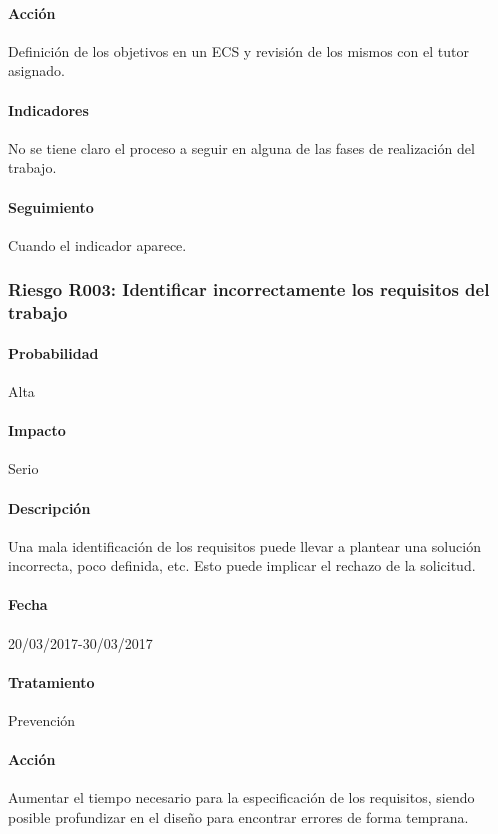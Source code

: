 \documentclass[10pt,a4paper]{article}
\begin{document}
				\paragraph{Acción} Definición de los objetivos en un ECS y revisión de los mismos con el tutor asignado. %
				\paragraph{Indicadores} No se tiene claro el proceso a seguir en alguna de las fases de realización del trabajo. %
				\paragraph{Seguimiento}	Cuando el indicador aparece. %
				
			\subsubsection{Riesgo R003: Identificar incorrectamente los requisitos del trabajo }
				\paragraph{Probabilidad} Alta
				\paragraph{Impacto}	Serio
				\paragraph{Descripción} Una mala identificación de los requisitos puede llevar a plantear una solución incorrecta, poco definida, etc. Esto puede implicar el rechazo de la solicitud.
				\paragraph{Fecha} 20/03/2017-30/03/2017 %
				\paragraph{Tratamiento} Prevención %
				\paragraph{Acción} Aumentar el tiempo necesario para la especificación de los requisitos, siendo posible profundizar en el diseño para encontrar errores de forma temprana. %
\end{document}
